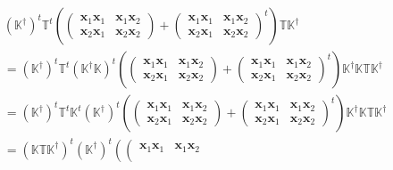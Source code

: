 \documentclass[aps, preprint]{revtex4}
\begin{document}
\begin{align} & \left (\mathbb{K}^{ \dag }\right )^{t} \mathbb{T}^{t} \left (\left (\begin{array}{cc}\mathbf{x}_{1} \mathbf{x}_{1} & \mathbf{x}_{1} \mathbf{x}_{2} \\
\mathbf{x}_{2} \mathbf{x}_{1} & \mathbf{x}_{2} \mathbf{x}_{2}\end{array}\right ) +\left (\begin{array}{cc}\mathbf{x}_{1} \mathbf{x}_{1} & \mathbf{x}_{1} \mathbf{x}_{2} \\
\mathbf{x}_{2} \mathbf{x}_{1} & \mathbf{x}_{2} \mathbf{x}_{2}\end{array}\right )^{t}\right ) \mathbb{T} \mathbb{K}^{ \dag } \\
 &  =\left (\mathbb{K}^{ \dag }\right )^{t} \mathbb{T}^{t} \left (\mathbb{K}^{ \dag } \mathbb{K}\right )^{t} \left (\left (\begin{array}{cc}\mathbf{x}_{1} \mathbf{x}_{1} & \mathbf{x}_{1} \mathbf{x}_{2} \\
\mathbf{x}_{2} \mathbf{x}_{1} & \mathbf{x}_{2} \mathbf{x}_{2}\end{array}\right ) +\left (\begin{array}{cc}\mathbf{x}_{1} \mathbf{x}_{1} & \mathbf{x}_{1} \mathbf{x}_{2} \\
\mathbf{x}_{2} \mathbf{x}_{1} & \mathbf{x}_{2} \mathbf{x}_{2}\end{array}\right )^{t}\right ) \mathbb{K}^{ \dag } \mathbb{K} \mathbb{T} \mathbb{K}^{ \dag } \\
 &  =\left (\mathbb{K}^{ \dag }\right )^{t} \mathbb{T}^{t} \mathbb{K}^{t} \left (\mathbb{K}^{ \dag }\right )^{t} \left (\left (\begin{array}{cc}\mathbf{x}_{1} \mathbf{x}_{1} & \mathbf{x}_{1} \mathbf{x}_{2} \\
\mathbf{x}_{2} \mathbf{x}_{1} & \mathbf{x}_{2} \mathbf{x}_{2}\end{array}\right ) +\left (\begin{array}{cc}\mathbf{x}_{1} \mathbf{x}_{1} & \mathbf{x}_{1} \mathbf{x}_{2} \\
\mathbf{x}_{2} \mathbf{x}_{1} & \mathbf{x}_{2} \mathbf{x}_{2}\end{array}\right )^{t}\right ) \mathbb{K}^{ \dag } \mathbb{K} \mathbb{T} \mathbb{K}^{ \dag } \\
 &  =\left (\mathbb{K} \mathbb{T} \mathbb{K}^{ \dag }\right )^{t} \left (\mathbb{K}^{ \dag }\right )^{t} \left (\left (\begin{array}{cc}\mathbf{x}_{1} \mathbf{x}_{1} & \mathbf{x}_{1} \mathbf{x}_{2} \\

\end{array}
\end{align}
\end{document}
